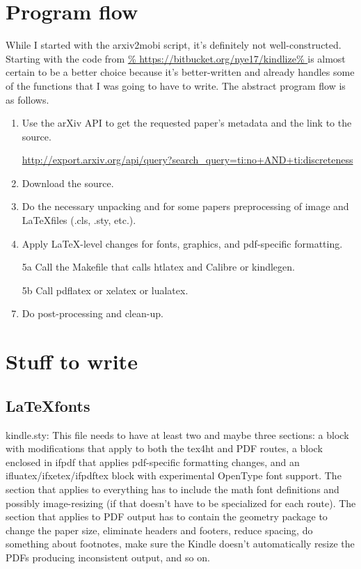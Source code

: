 \documentclass[12pt]{article}
\begin{document}
\section{Program flow}
\label{sec:program_flow}

While I started with the arxiv2mobi script, it's definitely not
well-constructed.  Starting with the code from \url{%
  https://bitbucket.org/nye17/kindlize%
} is almost certain to be a better choice because it's better-written
and already handles some of the functions that I was going to have to
write.  The abstract program flow is as follows.

\begin{enumerate}
\item Use the arXiv API to get the requested paper's metadata and the
link to the source.

\url{http://export.arxiv.org/api/query?search_query=ti:no+AND+ti:discreteness}

\item Download the source.

\item Do the necessary unpacking and for some papers preprocessing of
  image and \LaTeX files (.cls, .sty, etc.).

\item Apply \LaTeX-level changes for fonts, graphics, and pdf-specific
  formatting.  

\item[5a] Call the Makefile that calls htlatex and Calibre or kindlegen.

\item[5b] Call pdflatex or xelatex or lualatex.

\item Do post-processing and clean-up.
\end{enumerate}


\section{Stuff to write}
\label{sec:stuff_to_write}


\subsection{\LaTeX fonts}
\label{sec:latex_fonts}

kindle.sty: This file needs to have at least two and maybe three
sections: a block with modifications that apply to both the tex4ht and
PDF routes, a block enclosed in ifpdf that applies pdf-specific
formatting changes, and an ifluatex/ifxetex/ifpdftex block with
experimental OpenType font support.  The section that applies to
everything has to include the math font definitions and possibly
image-resizing (if that doesn't have to be specialized for each
route).  The section that applies to PDF output has to contain the
geometry package to change the paper size, eliminate headers and
footers, reduce spacing, do something about footnotes, make sure the
Kindle doesn't automatically resize the PDFs producing inconsistent
output, and so on.
\end{document}
